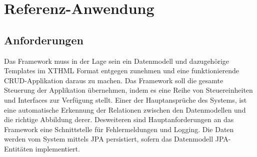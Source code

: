 \chapter{Referenz-Anwendung}

\section{Anforderungen}

Das Framework muss in der Lage sein ein Datenmodell und dazugehörige Templates im XTHML Format entgegen zunehmen und eine funktionierende
CRUD-Applikation daraus zu machen. Das Framework soll die gesamte Steuerung der Applikation übernehmen, indem es eine
Reihe von Steuereinheiten und Interfaces zur Verfügung stellt. Einer der Hauptansprüche des Systems, ist eine
automatische Erkennung der Relationen zwischen den Datenmodellen und die richtige Abbildung derer.
Desweiteren sind Hauptanforderungen an das Framework eine Schnittstelle für Fehlermeldungen und Logging. 
Die Daten werden vom System mittels JPA persistiert, sofern das Datenmodell JPA-Entitäten implementiert.



